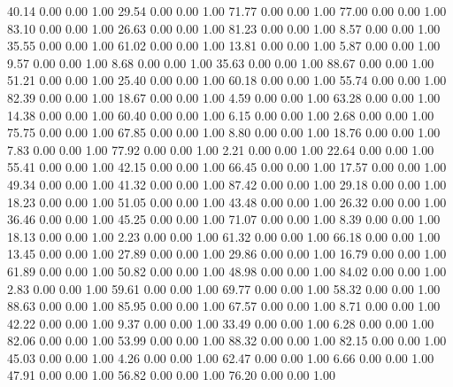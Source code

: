    40.14   0.00   0.00   1.00
   29.54   0.00   0.00   1.00
   71.77   0.00   0.00   1.00
   77.00   0.00   0.00   1.00
   83.10   0.00   0.00   1.00
   26.63   0.00   0.00   1.00
   81.23   0.00   0.00   1.00
    8.57   0.00   0.00   1.00
   35.55   0.00   0.00   1.00
   61.02   0.00   0.00   1.00
   13.81   0.00   0.00   1.00
    5.87   0.00   0.00   1.00
    9.57   0.00   0.00   1.00
    8.68   0.00   0.00   1.00
   35.63   0.00   0.00   1.00
   88.67   0.00   0.00   1.00
   51.21   0.00   0.00   1.00
   25.40   0.00   0.00   1.00
   60.18   0.00   0.00   1.00
   55.74   0.00   0.00   1.00
   82.39   0.00   0.00   1.00
   18.67   0.00   0.00   1.00
    4.59   0.00   0.00   1.00
   63.28   0.00   0.00   1.00
   14.38   0.00   0.00   1.00
   60.40   0.00   0.00   1.00
    6.15   0.00   0.00   1.00
    2.68   0.00   0.00   1.00
   75.75   0.00   0.00   1.00
   67.85   0.00   0.00   1.00
    8.80   0.00   0.00   1.00
   18.76   0.00   0.00   1.00
    7.83   0.00   0.00   1.00
   77.92   0.00   0.00   1.00
    2.21   0.00   0.00   1.00
   22.64   0.00   0.00   1.00
   55.41   0.00   0.00   1.00
   42.15   0.00   0.00   1.00
   66.45   0.00   0.00   1.00
   17.57   0.00   0.00   1.00
   49.34   0.00   0.00   1.00
   41.32   0.00   0.00   1.00
   87.42   0.00   0.00   1.00
   29.18   0.00   0.00   1.00
   18.23   0.00   0.00   1.00
   51.05   0.00   0.00   1.00
   43.48   0.00   0.00   1.00
   26.32   0.00   0.00   1.00
   36.46   0.00   0.00   1.00
   45.25   0.00   0.00   1.00
   71.07   0.00   0.00   1.00
    8.39   0.00   0.00   1.00
   18.13   0.00   0.00   1.00
    2.23   0.00   0.00   1.00
   61.32   0.00   0.00   1.00
   66.18   0.00   0.00   1.00
   13.45   0.00   0.00   1.00
   27.89   0.00   0.00   1.00
   29.86   0.00   0.00   1.00
   16.79   0.00   0.00   1.00
   61.89   0.00   0.00   1.00
   50.82   0.00   0.00   1.00
   48.98   0.00   0.00   1.00
   84.02   0.00   0.00   1.00
    2.83   0.00   0.00   1.00
   59.61   0.00   0.00   1.00
   69.77   0.00   0.00   1.00
   58.32   0.00   0.00   1.00
   88.63   0.00   0.00   1.00
   85.95   0.00   0.00   1.00
   67.57   0.00   0.00   1.00
    8.71   0.00   0.00   1.00
   42.22   0.00   0.00   1.00
    9.37   0.00   0.00   1.00
   33.49   0.00   0.00   1.00
    6.28   0.00   0.00   1.00
   82.06   0.00   0.00   1.00
   53.99   0.00   0.00   1.00
   88.32   0.00   0.00   1.00
   82.15   0.00   0.00   1.00
   45.03   0.00   0.00   1.00
    4.26   0.00   0.00   1.00
   62.47   0.00   0.00   1.00
    6.66   0.00   0.00   1.00
   47.91   0.00   0.00   1.00
   56.82   0.00   0.00   1.00
   76.20   0.00   0.00   1.00
